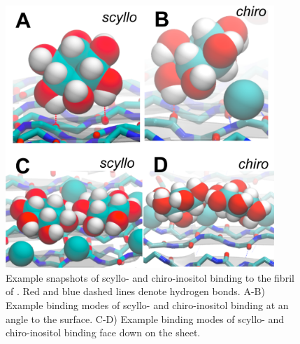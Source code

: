 \begin{figure}[ht]
  \centering
  \includegraphics[width=4in]{figures/results1/GA4_paper_figures_submitted-7}
  \caption[Binding of scyllo- and chiro-inositol to the fibrillar aggregate of \gafour.]{Example snapshots of scyllo- and chiro-inositol binding to the fibril of \gafour. Red and blue dashed lines denote hydrogen bonds. A-B) Example binding modes of scyllo- and chiro-inositol binding at an angle to the surface. C-D) Example binding modes of scyllo- and chiro-inositol binding face down on the sheet. }
   \label{fig:figure7}
\end{figure}

